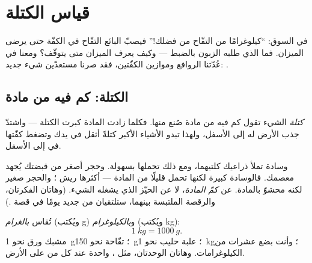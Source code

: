 \chapter{قياس الكتلة}\label{ch:g3:measuring-mass}

في السوق: ``كيلوغرامًا من التفّاح من فضلك!'' فيصبّ البائع التفّاح
في الكفّة حتى يرضى الميزان. فما الذي طلبه الزبون بالضبط --- وكيف
يعرف الميزان متى يتوقّف؟ ومعنا في عُدّتنا الروافع وموازين
الكفّتين، فقد صرنا مستعدّين  شيء جديد: .

\section{الكتلة: كم فيه من مادة}

\begin{definition}[الكتلة]\label{def:g3:measuring-mass:mass}
\emph{كتلة} الشيء تقول كم فيه من مادة صُنع منها.
فكلما زادت المادة كبرت الكتلة --- واشتدّ جذب الأرض له إلى الأسفل،
ولهذا تبدو الأشياء الأكبر كتلةً أثقل في يدك وتضغط كفّتها في
 إلى الأسفل.
\end{definition}

\begin{example}\label{ex:g3:measuring-mass:bignotcheavy}
وسادة تملأ ذراعيك كلتيهما، ومع ذلك تحملها بسهولة. وحجر أصغر من
قبضتك يُجهد معصمك. فالوسادة كبيرة لكنها تحمل قليلًا من المادة ---
أكثرها ريش ؛ والحجر صغير لكنه محشوّ بالمادة.  عن
\emph{كمّ المادة}، لا عن الحيّز الذي يشغله الشيء. (وهاتان
الفكرتان، والرقصة الملتبسة بينهما، ستلتقيان من جديد يومًا في قصة
 .)
\end{example}

\begin{definition}\label{def:g3:measuring-mass:units}
تُقاس  \emph{بالغرام} (ويُكتب \unit{g})
و\emph{بالكيلوغرام} (ويُكتب \unit{kg}):
\[
\qty{1}{kg} = \qty{1000}{g}.
\]
 مشبك ورق نحو \qty{1}{g}؛  تفّاحة نحو \qty{150}{g}؛
 علبة حليب نحو \qty{1}{kg}؛ وأنت بضع عشرات من
الكيلوغرامات. وهاتان الوحدتان، مثل ، واحدة عند كل من على
الأرض.
\end{definition}

